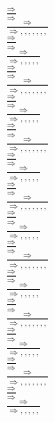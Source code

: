 \documentclass[11pt]{article}
\begin{document}
\begin{center}
\bigskip
\\$\frac{\Rightarrow }{\Rightarrow }$
\bigskip
\\$\frac{\Rightarrow }{\Rightarrow , , , , , , , }$
\bigskip
\\$\frac{\Rightarrow }{\Rightarrow }$
\bigskip
\\$\frac{\Rightarrow }{\Rightarrow , , , , , }$
\bigskip
\\$\frac{\Rightarrow }{\Rightarrow }$
\bigskip
\\$\frac{\Rightarrow }{\Rightarrow , , , , , , , }$
\bigskip
\\$\frac{\Rightarrow }{\Rightarrow }$
\bigskip
\\$\frac{\Rightarrow }{\Rightarrow , , , , , }$
\bigskip
\\$\frac{\Rightarrow }{\Rightarrow }$
\bigskip
\\$\frac{\Rightarrow }{\Rightarrow , , , , , , , }$
\bigskip
\\$\frac{\Rightarrow }{\Rightarrow }$
\bigskip
\\$\frac{\Rightarrow }{\Rightarrow , , , , , }$
\bigskip
\\$\frac{\Rightarrow }{\Rightarrow }$
\bigskip
\\$\frac{\Rightarrow }{\Rightarrow , , , , , , , }$
\bigskip
\\$\frac{\Rightarrow }{\Rightarrow }$
\bigskip
\\$\frac{\Rightarrow }{\Rightarrow , , , , , }$
\bigskip
\\$\frac{\Rightarrow }{\Rightarrow }$
\bigskip
\\$\frac{\Rightarrow }{\Rightarrow , , , , , , , }$
\bigskip
\\$\frac{\Rightarrow }{\Rightarrow }$
\bigskip
\\$\frac{\Rightarrow }{\Rightarrow , , , , , }$
\bigskip
\\$\frac{\Rightarrow }{\Rightarrow }$
\bigskip
\\$\frac{\Rightarrow }{\Rightarrow , , , , , , , }$
\bigskip
\\$\frac{\Rightarrow }{\Rightarrow }$
\bigskip
\\$\frac{\Rightarrow }{\Rightarrow , , , , , }$
\bigskip
\\$\frac{\Rightarrow }{\Rightarrow }$
\bigskip
\\$\frac{\Rightarrow }{\Rightarrow , , , , , , , }$
\bigskip
\\$\frac{\Rightarrow }{\Rightarrow }$
\bigskip
\\$\frac{\Rightarrow }{\Rightarrow , , , , , }$

\end{center}
\end{document}
